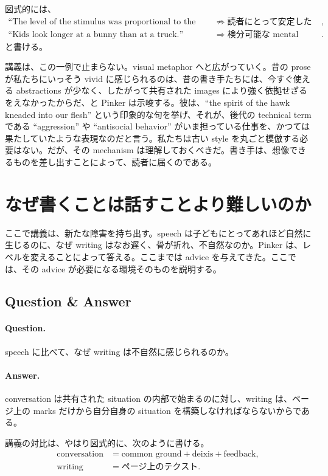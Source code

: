図式的には、
\begin{align}
\text{``The level of the stimulus was proportional to the intensity of the reaction.''}
&\not\Rightarrow \text{読者にとって安定した scene}, \\
\text{``Kids look longer at a bunny than at a truck.''}
&\Rightarrow \text{検分可能な mental picture}.
\end{align}
と書ける。

講義は、この一例で止まらない。visual metaphor へと広がっていく。昔の prose が私たちにいっそう vivid に感じられるのは、昔の書き手たちには、今すぐ使える abstractions が少なく、したがって共有された images により強く依拠せざるをえなかったからだ、と Pinker は示唆する。彼は、``the spirit of the hawk kneaded into our flesh'' という印象的な句を挙げ、それが、後代の technical term である ``aggression'' や ``antisocial behavior'' がいま担っている仕事を、かつては果たしていたような表現なのだと言う。私たちは古い style を丸ごと模倣する必要はない。だが、その mechanism は理解しておくべきだ。書き手は、想像できるものを差し出すことによって、読者に届くのである。

\section{なぜ書くことは話すことより難しいのか}

ここで講義は、新たな障害を持ち出す。speech は子どもにとってあれほど自然に生じるのに、なぜ writing はなお遅く、骨が折れ、不自然なのか。Pinker は、レベルを変えることによって答える。ここまでは advice を与えてきた。ここでは、その advice が必要になる環境そのものを説明する。

\subsection{Question \& Answer}

\paragraph{Question.} speech に比べて、なぜ writing は不自然に感じられるのか。

\paragraph{Answer.} conversation は共有された situation の内部で始まるのに対し、writing は、ページ上の marks だけから自分自身の situation を構築しなければならないからである。

講義の対比は、やはり図式的に、次のように書ける。
\begin{align}
\text{conversation} &= \text{common ground} + \text{deixis} + \text{feedback}, \\
\text{writing} &= \text{ページ上のテクスト}.
\end{align}

